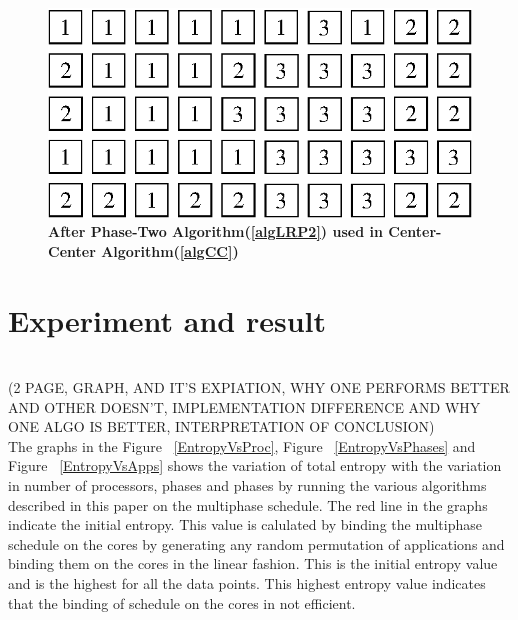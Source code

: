\documentclass[10pt, conference]{IEEEtran}
\begin{document}
\begin{figure} [tb]
\centering
\includegraphics[scale=0.45]{figure/phase_two_center_center.eps}
\caption{\textbf{After Phase-Two Algorithm(\ref{algLRP2}) used in Center-Center Algorithm(\ref{algCC}) }}
\label{imgCCP2}
\end{figure}



	
\section{Experiment and result}

\ \\ 
(2 PAGE, GRAPH, AND IT'S EXPIATION, WHY ONE PERFORMS BETTER AND OTHER DOESN'T, IMPLEMENTATION DIFFERENCE AND WHY ONE ALGO IS BETTER, INTERPRETATION OF CONCLUSION) \ \\
The graphs in the Figure ~\ref{EntropyVsProc}, Figure ~\ref{EntropyVsPhases} and Figure ~\ref{EntropyVsApps} shows the variation of total entropy with the variation in number of processors, phases and phases by running the various algorithms described in this paper on the multiphase schedule. The red line in the graphs indicate the initial entropy. This value is calulated by binding the multiphase schedule on the cores by generating any random permutation of applications and binding them on the cores in the linear fashion. This is the initial entropy value and is the highest for all the data points. This highest entropy value indicates that the binding of schedule on the cores in not efficient. \ \\
\end{document}
